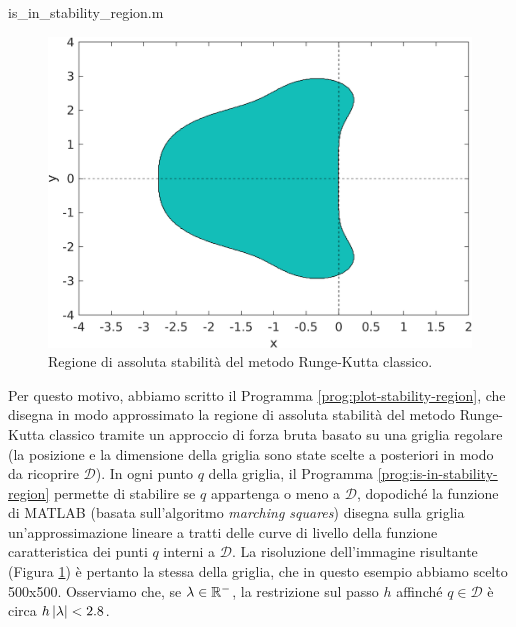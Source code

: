 

 {is_in_stability_region.m}

\begin{figure}[p]
\centering
\includegraphics[height=0.35\textheight]{regione-RK-classico.png}
\caption{Regione di assoluta stabilità del metodo Runge-Kutta classico.}
\label{fig:regione-RK-classico}
\end{figure}

Per questo motivo, abbiamo scritto il Programma \ref{prog:plot-stability-region},
che disegna in modo approssimato la regione di assoluta stabilità del metodo
Runge-Kutta classico tramite un approccio di forza bruta basato su una griglia
regolare (la posizione e la dimensione della griglia sono state scelte a posteriori
in modo da ricoprire $\mathcal{D}$).
In ogni punto $q$ della griglia, il Programma \ref{prog:is-in-stability-region}
permette di stabilire se $q$ appartenga o meno a $\mathcal{D}$,
dopodiché la funzione  di MATLAB (basata sull'algoritmo
\emph{marching squares}) disegna sulla griglia un'approssimazione lineare a tratti
delle curve di livello della funzione caratteristica
dei punti $q$ interni a $\mathcal{D}$. La risoluzione dell'immagine risultante
(Figura \ref{fig:regione-RK-classico}) è pertanto la stessa della griglia,
che in questo esempio abbiamo scelto 500x500. Osserviamo che, se $\lambda \in \mathbb{R}^-$,
la restrizione sul passo $h$ affinché $q \in \mathcal{D}$ è circa $h \left\lvert\lambda\right\rvert < 2.8$.


